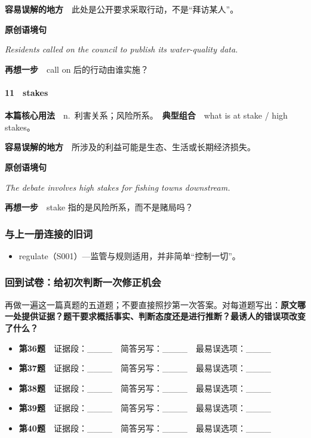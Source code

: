 \documentclass[
  11pt,
]{ctexart}
\providecommand{\tightlist}{%
  \setlength{\itemsep}{0pt}\setlength{\parskip}{0pt}}
\renewenvironment{quote}{\begin{tcolorbox}[enhanced,breakable,colback=sand,colframe=primary!22,boxrule=0.4pt,arc=2pt,left=2.6mm,right=2.6mm,top=1.6mm,bottom=1.6mm]\itshape}{\end{tcolorbox}}
\begin{document}
\textbf{容易误解的地方}　此处是公开要求采取行动，不是``拜访某人''。

\textbf{原创语境句}

\begin{quote}
Residents called on the council to publish its water-quality data.
\end{quote}

\textbf{再想一步}　call on 后的行动由谁实施？

\paragraph{11　stakes}\label{stakes}

\textbf{本篇核心用法}　n.~利害关系；风险所系。　\textbf{典型组合}　what
is at stake / high stakes。

\textbf{容易误解的地方}　所涉及的利益可能是生态、生活或长期经济损失。

\textbf{原创语境句}

\begin{quote}
The debate involves high stakes for fishing towns downstream.
\end{quote}

\textbf{再想一步}　stake 指的是风险所系，而不是赌局吗？

\subsubsection{与上一册连接的旧词}\label{ux4e0eux4e0aux4e00ux518cux8fdeux63a5ux7684ux65e7ux8bcd}

\begin{itemize}
\tightlist
\item
  regulate（S001）---监管与规则适用，并非简单``控制一切''。
\end{itemize}

\subsubsection{回到试卷：给初次判断一次修正机会}\label{ux56deux5230ux8bd5ux5377ux7ed9ux521dux6b21ux5224ux65adux4e00ux6b21ux4feeux6b63ux673aux4f1a}

再做一遍这一篇真题的五道题；不要直接照抄第一次答案。对每道题写出：\textbf{原文哪一处提供证据？题干要求概括事实、判断态度还是进行推断？最诱人的错误项改变了什么？}

\begin{itemize}
\item
  \textbf{第36题}　证据段：\_\_\_\_　简答另写：\_\_\_\_　最易误选项：\_\_\_\_
\item
  \textbf{第37题}　证据段：\_\_\_\_　简答另写：\_\_\_\_　最易误选项：\_\_\_\_
\item
  \textbf{第38题}　证据段：\_\_\_\_　简答另写：\_\_\_\_　最易误选项：\_\_\_\_
\item
  \textbf{第39题}　证据段：\_\_\_\_　简答另写：\_\_\_\_　最易误选项：\_\_\_\_
\item
  \textbf{第40题}　证据段：\_\_\_\_　简答另写：\_\_\_\_　最易误选项：\_\_\_\_
\end{itemize}
\end{document}
